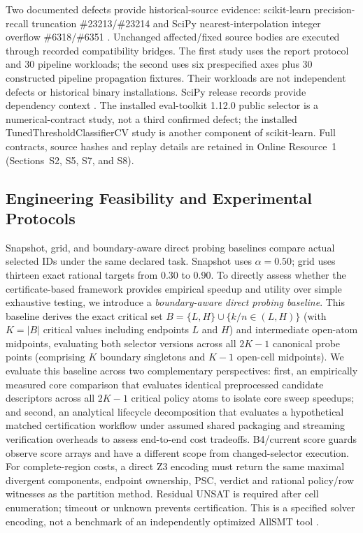 \documentclass[11pt,a4paper]{article}
\begin{document}
Two documented defects provide historical-source evidence: scikit-learn precision-recall truncation \#23213/\#23214 \cite{sklearn_issue23213,sklearn_pr23214} and SciPy nearest-interpolation integer overflow \#6318/\#6351 \cite{scipy_issue6318,scipy_pr6351}. Unchanged affected/fixed source bodies are executed through recorded compatibility bridges. The first study uses the report protocol and 30 pipeline workloads; the second uses six prespecified axes plus 30 constructed pipeline propagation fixtures. Their workloads are not independent defects or historical binary installations. SciPy release records provide dependency context \cite{scipy_news}. The installed eval-toolkit 1.12.0 public selector \cite{behring2026evaltoolkit} is a numerical-contract study, not a third confirmed defect; the installed TunedThresholdClassifierCV study \cite{sklearn_tuned} is another component of scikit-learn. Full contracts, source hashes and replay details are retained in Online Resource~1 (Sections~S2, S5, S7, and S8).


\subsection{Engineering Feasibility and Experimental Protocols}\label{subsec:feasibility}

Snapshot, grid, and boundary-aware direct probing baselines compare actual selected IDs under the same declared task. Snapshot uses $\alpha=0.50$; grid uses thirteen exact rational targets from 0.30 to 0.90. To directly assess whether the certificate-based framework provides empirical speedup and utility over simple exhaustive testing, we introduce a \textit{boundary-aware direct probing baseline}. This baseline derives the exact critical set $B = \{L, H\} \cup \{k/n \in (L, H)\}$ (with $K = |B|$ critical values including endpoints $L$ and $H$) and intermediate open-atom midpoints, evaluating both selector versions across all $2K-1$ canonical probe points (comprising $K$ boundary singletons and $K-1$ open-cell midpoints). We evaluate this baseline across two complementary perspectives: first, an empirically measured core comparison that evaluates identical preprocessed candidate descriptors across all $2K-1$ critical policy atoms to isolate core sweep speedups; and second, an analytical lifecycle decomposition that evaluates a hypothetical matched certification workflow under assumed shared packaging and streaming verification overheads to assess end-to-end cost tradeoffs. B4/current score guards observe score arrays and have a different scope from changed-selector execution. For complete-region costs, a direct Z3 encoding \cite{demoura2008z3} must return the same maximal divergent components, endpoint ownership, PSC, verdict and rational policy/row witnesses as the partition method. Residual UNSAT is required after cell enumeration; timeout or unknown prevents certification. This is a specified solver encoding, not a benchmark of an independently optimized AllSMT tool \cite{mathsat_api,spallitta2025disjoint}.
\end{document}
